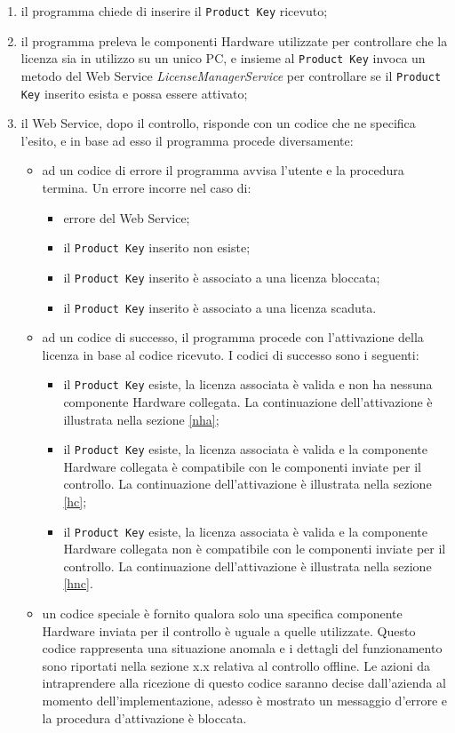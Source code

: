 \begin{enumerate}
\item il programma chiede di inserire il \texttt{Product Key} ricevuto;
\item il programma preleva le componenti Hardware utilizzate per controllare che la licenza sia in utilizzo su un unico PC, e insieme al \texttt{Product Key} invoca un metodo del Web Service \textit{LicenseManagerService} per controllare se il \texttt{Product Key} inserito esista e possa essere attivato;
\item il Web Service, dopo il controllo, risponde con un codice che ne specifica l'esito, e in base ad esso il programma procede diversamente:
\begin{itemize}
\item ad un codice di errore il programma avvisa l'utente e la procedura termina. Un errore incorre nel caso di: \begin{itemize}
\item errore del Web Service;
\item il \texttt{Product Key} inserito non esiste;
\item il \texttt{Product Key} inserito è associato a una licenza bloccata;
\item il \texttt{Product Key} inserito è associato a una licenza scaduta.
\end{itemize}
\item ad un codice di successo, il programma procede con l'attivazione della licenza in base al codice ricevuto. I codici di successo sono i seguenti:
\begin{itemize}
\item il \texttt{Product Key} esiste, la licenza associata è valida e non ha nessuna componente Hardware collegata. La continuazione dell'attivazione è illustrata nella sezione \ref{nha};
\item il \texttt{Product Key} esiste, la licenza associata è valida e la componente Hardware collegata è compatibile con le componenti inviate per il controllo. La continuazione dell'attivazione è illustrata nella sezione \ref{hc};
\item il \texttt{Product Key} esiste, la licenza associata è valida e la componente Hardware collegata non è compatibile con le componenti inviate per il controllo. La continuazione dell'attivazione è illustrata nella sezione \ref{hnc}.
\end{itemize}
\item un codice speciale è fornito qualora solo una specifica componente Hardware inviata per il controllo è uguale a quelle utilizzate. Questo codice rappresenta una situazione anomala e i dettagli del funzionamento sono riportati nella sezione x.x relativa al controllo offline. Le azioni da intraprendere alla ricezione di questo codice saranno decise dall'azienda al momento dell'implementazione, adesso è mostrato un messaggio d'errore e la procedura d'attivazione è bloccata.
\end{itemize}
\end{enumerate}

